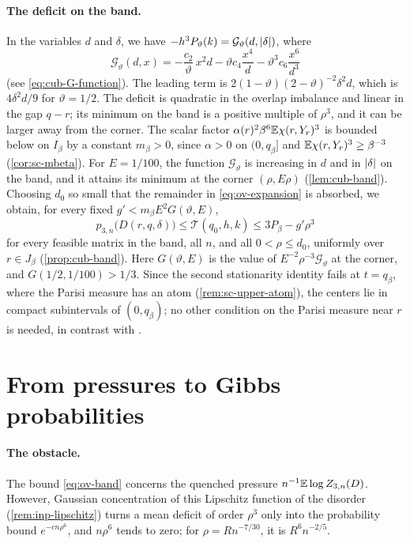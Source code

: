 \paragraph{The deficit on the band.} In the variables $d$ and $\delta$, we
have $-h^3P_\vartheta(k)=\mathcal G_\vartheta(d,\lvert \delta\rvert)$, where
\[
 \mathcal G_\vartheta(d,x)=-\frac{c_2}\vartheta\,x^2d-\vartheta c_4\frac{x^4}d
 -\vartheta^3c_6\frac{x^6}{d^3}
\]
(see \eqref{eq:cub-G-function}). The leading term is
$2(1-\vartheta)(2-\vartheta)^{-2}\delta^2d$, which is $4\delta^2d/9$ for
$\vartheta=1/2$. The deficit is quadratic in the overlap imbalance and
linear in the gap $q-r$; its minimum on the band is a positive multiple of
$\rho^3$, and it can be larger away from the corner. The scalar factor
$\alpha(r)^2\beta^6\mathbb E\chi(r,Y_r)^3$ is bounded below on $I_\beta$ by a constant
$m_\beta>0$, since $\alpha>0$ on $(0,q_\beta]$ and
$\mathbb E\chi(r,Y_r)^3\ge\beta^{-3}$ (\cref{cor:sc-mbeta}). For $E=1/100$, the
function $\mathcal G_\vartheta$ is increasing in $d$ and in $\lvert \delta\rvert$ on the
band, and it attains its minimum at the corner $(\rho,E\rho)$
(\cref{lem:cub-band}). Choosing $d_0$ so small that the remainder in
\eqref{eq:ov-expansion} is absorbed, we obtain, for every fixed
$g'<m_\beta E^2G(\vartheta,E)$,
\begin{equation}\label{eq:ov-band}
 p_{3,n}\bigl(D(r,q,\delta)\bigr)\le\mathcal T(q_0,h,k)\le3P_\beta-g'\rho^3
\end{equation}
for every feasible matrix in the band, all $n$, and all $0<\rho\le d_0$,
uniformly over $r\in J_\beta$ (\cref{prop:cub-band}). Here $G(\vartheta,E)$ is the value of
$E^{-2}\rho^{-3}\mathcal G_\vartheta$ at the corner, and $G(1/2,1/100)>1/3$.
Since the second stationarity identity fails at $t=q_\beta$, where the Parisi
measure has an atom (\cref{rem:sc-upper-atom}), the centers lie in compact
subintervals of $(0,q_\beta)$; no other condition on the Parisi measure near
$r$ is needed, in contrast with \cite[Lemma~7.1]{oai-barriers}.

\section{From pressures to Gibbs probabilities}\label{sec:ov-static}

\paragraph{The obstacle.} The bound \eqref{eq:ov-band} concerns the quenched
pressure $n^{-1}\mathbb E\log Z_{3,n}(D)$. However, Gaussian concentration of this
Lipschitz function of the disorder (\cref{rem:inp-lipschitz}) turns a mean
deficit of order $\rho^3$ only into the probability bound $e^{-cn\rho^6}$, and
$n\rho^6$ tends to zero; for $\rho=Rn^{-7/30}$, it is $R^6n^{-2/5}$.

